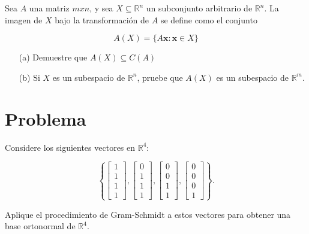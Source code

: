 Sea $A$ una matriz $mxn$, y sea $X \subseteq \mathbb{R}^n$ un subconjunto arbitrario de $\mathbb{R}^n$. La imagen de $X$ bajo la transformación de $A$ se define como el conjunto

$$
A(X) = \{ A \mathbf{x} : \mathbf{x} \in X \}
$$

\begin{itemize}
    \item[(a)] Demuestre que $A(X) \subseteq C(A)$

    \item[(b)] Si $X$ es un subespacio de $\mathbb{R}^n$, pruebe que $A(X)$ es un subespacio de $\mathbb{R}^m$.
\end{itemize}

\section{Problema}

Considere los siguientes vectores en $\mathbb{R}^4$:

\[
    \left\{ 
    \begin{bmatrix}
    1 \\ 
    1 \\ 
    1 \\
    1
    \end{bmatrix}
    ,
    \begin{bmatrix}
    0 \\ 
    1 \\ 
    1 \\
    1
    \end{bmatrix}
    ,
    \begin{bmatrix}
    0 \\ 
    0 \\ 
    1 \\
    1
    \end{bmatrix}
    ,
    \begin{bmatrix}
    0 \\ 
    0 \\ 
    0 \\
    1
    \end{bmatrix} \right\}.
    \]

Aplique el procedimiento de Gram-Schmidt a estos vectores para obtener una base ortonormal de $\mathbb{R}^4$.


